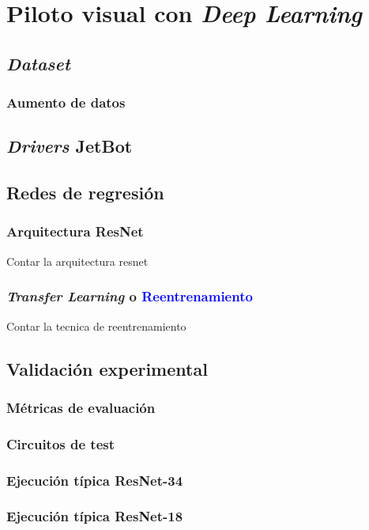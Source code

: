\chapter{Piloto visual con \textit{Deep Learning}}

\section{\textit{Dataset}}

\subsection{Aumento de datos}

\section{\textit{Drivers} JetBot}

\section{Redes de regresión}
\subsection{Arquitectura ResNet}
Contar la arquitectura resnet
\subsection{\textit{Transfer Learning} o \textcolor{blue}{Reentrenamiento}}
Contar la tecnica de reentrenamiento


\section{Validación experimental}

\subsection{Métricas de evaluación}
\subsection{Circuitos de test}
\subsection{Ejecución típica ResNet-34}
\subsection{Ejecución típica ResNet-18}
